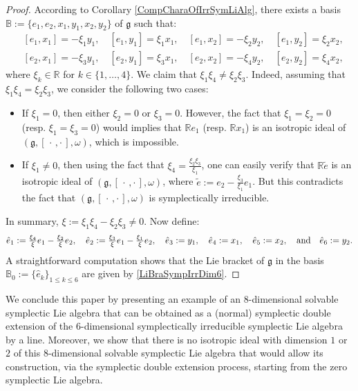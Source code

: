 \documentclass[final,1p,times,nopreprintline]{elsarticle}
\theoremstyle{definition}
\numberwithin{equation}{section}
\newcommand{\rel}{\mathbb{R}}
\newcommand{\w}{\omega}
\newcommand{\et}{\quad \textnormal{and}\quad}
\newcommand{\g}{\mathfrak{g}}
\numberwithin{equation}{section}
\newcommand{\cro}{[\,\cdot\,,\cdot\,]}
\begin{document}
\begin{proof}
	According to Corollary \ref{CompCharaOfIrrSymLiAlg}, there exists a basis $\mathbb{B}:=\{e_1,e_2,x_1,y_1,x_2,y_2\}$ of $\g$ such that:
	\begin{eqnarray*}
		&[e_1,x_1]=-\xi_1 y_1,\quad [e_1,y_1]=\xi_1x_1,\quad [e_1,x_2]=-\xi_2y_2,\quad [e_1,y_2]=\xi_2x_2,\\
		&[e_2,x_1]=-\xi_3 y_1,\quad [e_2,y_1]=\xi_3x_1,\quad [e_2,x_2]=-\xi_4y_2,\quad [e_2,y_2]=\xi_4x_2,
	\end{eqnarray*}
	where $\xi_k\in\rel$ for $k\in\{1,\ldots,4\}$. We claim that $\xi_1\xi_4\neq\xi_2\xi_3$. Indeed, assuming that $\xi_1\xi_4=\xi_2\xi_3$, we consider the following two cases:
	\begin{itemize}
		\item[$1.$] If $\xi_1=0$, then either $\xi_2=0$ or $\xi_3=0$. However, the fact that $\xi_1=\xi_2=0$ (resp. $\xi_1=\xi_3=0$) would implies that $\rel e_1$ (resp. $\rel x_1$) is an isotropic ideal of $(\g,\cro,\w)$, which is impossible.
		\item[$2.$] If $\xi_1\neq 0$, then using the fact that $\xi_4=\tfrac{\xi_2\xi_3}{\xi_1}$, one can easily verify that $\rel\widetilde{e}$ is an isotropic ideal of $(\g,\cro,\w)$, where $\widetilde{e}:=e_2-\tfrac{\xi_3}{\xi_1}e_1$. But this contradicts the fact that $(\g,\cro,\w)$ is symplectically irreducible.
	\end{itemize}
	In summary, $\xi:=\xi_1\xi_4-\xi_2\xi_3\neq 0$. Now define:
	\begin{equation*}
		\hat{e}_1:=\tfrac{\xi_4}{\xi}e_1-\tfrac{\xi_2}{\xi}e_2,\quad\hat{e}_2:=\tfrac{\xi_3}{\xi}e_1-\tfrac{\xi_1}{\xi}e_2,\quad\hat{e}_3:=y_1,\quad\hat{e}_4:=x_1,\quad\hat{e}_5:=x_2,\et\hat{e}_6:=y_2.
	\end{equation*}
	A straightforward computation shows that the Lie bracket of $\g$ in the basis $\mathbb{B}_0:=\{\hat{e}_k\}_{1\leqslant k\leqslant 6}$ are given by \eqref{LiBraSympIrrDim6}.
\end{proof}

We conclude this paper by presenting an example of an $8$-dimensional solvable symplectic Lie algebra that can be obtained as a (normal) symplectic double extension of the $6$-dimensional symplectically irreducible symplectic Lie algebra by a line. Moreover, we show that there is no isotropic ideal with dimension $1$ or $2$ of this $8$-dimensional solvable symplectic Lie algebra that would allow its construction, via the symplectic double extension process, starting from the zero symplectic Lie algebra.
\end{document}
